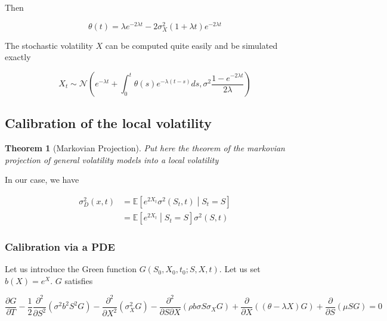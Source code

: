 \documentclass{article}
\newtheorem{theorem}{Theorem}[section]
\begin{document}
\noindent Then

\begin{equation}
	\theta(t) = \lambda e^{-2\lambda t} -2 \sigma_X^2 (1 + \lambda t) e^{-2\lambda t}
\end{equation}

\noindent The stochastic volatility $X$ can be computed quite easily and be simulated exactly

\begin{equation}
	X_t \sim \mathcal{N}\left(e^{-\lambda t} + \int_0^t \theta(s) e^{-\lambda (t-s)} ds, \sigma^2 \frac{1 - e^{-2\lambda t}}{2\lambda}\right)
\end{equation}

\subsection{Calibration of the local volatility}

\begin{theorem}[Markovian Projection]
Put here the theorem of the markovian projection of general volatility models into a local volatility
\end{theorem}

\noindent In our case, we have

\begin{equation}
\begin{aligned}
	\sigma_D^2(x, t) &= \mathbb{E} \left[ e^{2X_t} \sigma^2(S_t, t) \middle| S_t = S\right]\\
	&= \mathbb{E}\left[e^{2X_t} \middle| S_t = S \right] \sigma^2(S,t)
\end{aligned}
\end{equation}

\subsubsection{Calibration via a PDE}
\noindent Let us introduce the Green function $G(S_0, X_0, t_0 ; S, X, t)$.  Let us set $b(X) = e^{X}$. $G$ satisfies

\begin{equation}
	\frac{\partial G}{\partial T} 
- \frac{1}{2} \frac{\partial^2}{\partial S^2} \left(\sigma^2 b^2 S^2 G\right) 
- \frac{\partial^2}{\partial X^2} \left( \sigma_X^2 G\right) 
- \frac{\partial^2}{\partial S \partial X} \left(\rho b \sigma S \sigma_X G \right) 
+ \frac{\partial }{\partial X}\left( (\theta - \lambda X) G\right) 
+ \frac{\partial }{\partial S}(\mu S G)
 = 0
\end{equation}
\end{document}
